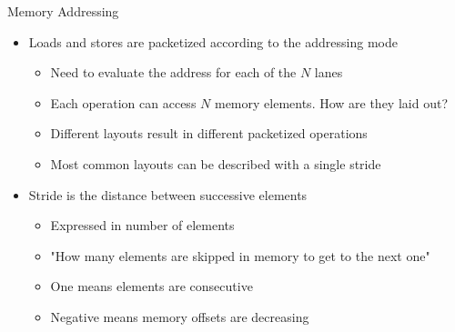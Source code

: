 \begin{frame}{Memory Addressing}

\begin{itemize}
    \item Loads and stores are packetized according to the addressing mode
    \begin{itemize}
        \item Need to evaluate the address for each of the $N$ lanes
        \item Each operation can access $N$ memory elements. How are they laid out?
        \item Different layouts result in different packetized operations
        \item Most common layouts can be described with a single stride
    \end{itemize}
    
    \item Stride is the distance between successive elements
    \begin{itemize}
        \item Expressed in number of elements
        \item "How many elements are skipped in memory to get to the next one"
        \item One means elements are consecutive
        \item Negative means memory offsets are decreasing
    \end{itemize}
    
    
\end{itemize}

\end{frame}



